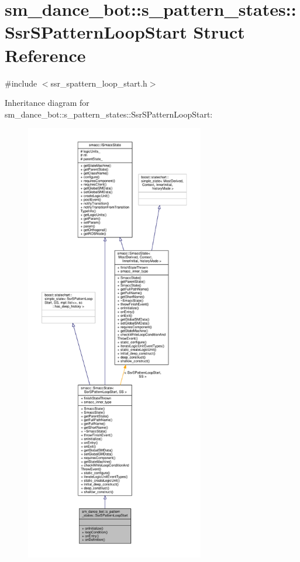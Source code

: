 \hypertarget{structsm__dance__bot_1_1s__pattern__states_1_1SsrSPatternLoopStart}{}\section{sm\+\_\+dance\+\_\+bot\+:\+:s\+\_\+pattern\+\_\+states\+:\+:Ssr\+S\+Pattern\+Loop\+Start Struct Reference}
\label{structsm__dance__bot_1_1s__pattern__states_1_1SsrSPatternLoopStart}


{\ttfamily \#include $<$ssr\+\_\+spattern\+\_\+loop\+\_\+start.\+h$>$}



Inheritance diagram for sm\+\_\+dance\+\_\+bot\+:\+:s\+\_\+pattern\+\_\+states\+:\+:Ssr\+S\+Pattern\+Loop\+Start\+:\nopagebreak
\begin{figure}[H]
\begin{center}
\leavevmode
\includegraphics[height=550pt]{structsm__dance__bot_1_1s__pattern__states_1_1SsrSPatternLoopStart__inherit__graph}
\end{center}
\end{figure}


